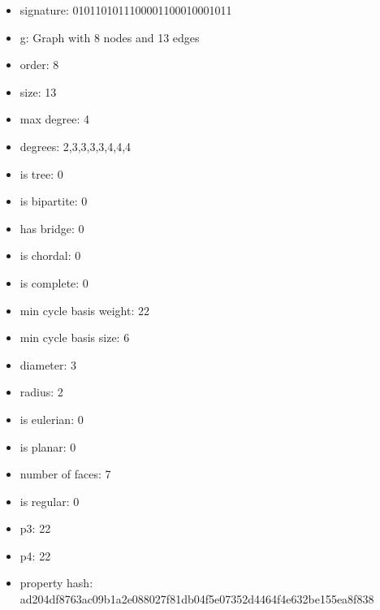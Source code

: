 \begin{itemize}
\item signature: 0101101011100001100010001011
\item g: Graph with 8 nodes and 13 edges
\item order: 8
\item size: 13
\item max degree: 4
\item degrees: 2,3,3,3,3,4,4,4
\item is tree: 0
\item is bipartite: 0
\item has bridge: 0
\item is chordal: 0
\item is complete: 0
\item min cycle basis weight: 22
\item min cycle basis size: 6
\item diameter: 3
\item radius: 2
\item is eulerian: 0
\item is planar: 0
\item number of faces: 7
\item is regular: 0
\item p3: 22
\item p4: 22
\item property hash: ad204df8763ac09b1a2e088027f81db04f5e07352d4464f4e632be155ea8f838
\end{itemize}
\newpage
\begin{figure}
\end{figure}
